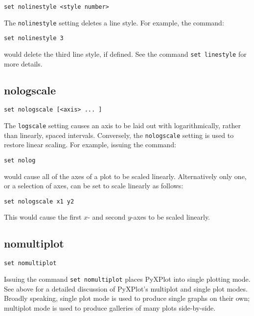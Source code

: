 \begin{verbatim}
set nolinestyle <style number>
\end{verbatim}

The {\tt nolinestyle} setting deletes a line style. For example, the command:

\begin{verbatim}
set nolinestyle 3
\end{verbatim}

\noindent would delete the third line style, if defined. See the command {\tt set
linestyle} for more details.


\subsection{nologscale}

\begin{verbatim}
set nologscale [<axis> ... ]
\end{verbatim}

The {\tt logscale} setting causes an axis to be laid out with logarithmically,
rather than linearly, spaced intervals. Conversely, the {\tt nologscale} setting
is used to restore linear scaling. For example, issuing the command:

\begin{verbatim}
set nolog 
\end{verbatim}

\noindent would cause all of the axes of a plot to be scaled linearly. Alternatively only one,
or a selection of axes, can be set to scale linearly as follows:

\begin{verbatim}
set nologscale x1 y2
\end{verbatim}

This would cause the first $x$- and second $y$-axes to be scaled linearly.


\subsection{nomultiplot}

\begin{verbatim}
set nomultiplot
\end{verbatim}

Issuing the command {\tt set nomultiplot} places PyXPlot into single plotting
mode.  See above for a detailed discussion of PyXPlot's multiplot and
single plot modes. Broadly speaking, single plot mode is used to produce single
graphs on their own; multiplot mode is used to produce galleries of many plots
side-by-side.



